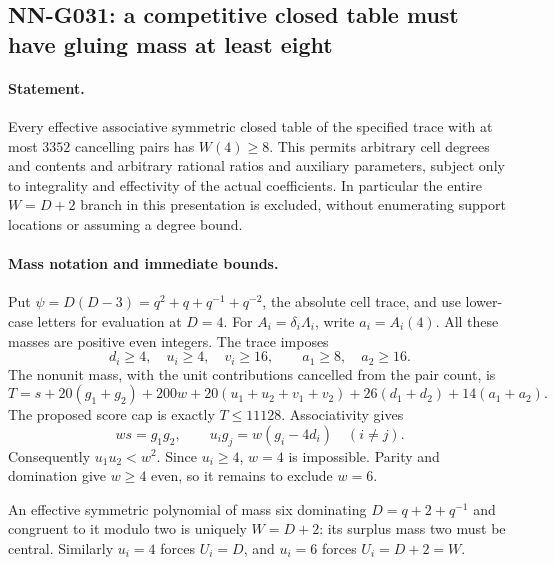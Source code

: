 \subsection{NN-G031: a competitive closed table must have gluing mass at least eight}
\paragraph{Statement.}
Every effective associative symmetric closed table of the specified trace
with at most $3352$ cancelling pairs has $W(4)\ge8$.
This permits arbitrary cell degrees and contents and arbitrary
rational ratios and auxiliary parameters, subject only to
integrality and effectivity of the actual coefficients.
In particular the entire $W=D+2$ branch in this presentation is excluded, without
enumerating support locations or assuming a degree bound.

\paragraph{Mass notation and immediate bounds.}
Put $\psi=D(D-3)=q^2+q+q^{-1}+q^{-2}$, the absolute
cell trace, and use lower-case letters for evaluation at $D=4$.
For $A_i=\delta_i\Lambda_i$, write $a_i=A_i(4)$.
All these masses are positive even integers. The trace imposes
\[
 d_i\ge4,\quad u_i\ge4,\quad v_i\ge16,\qquad
 a_1\ge8,\quad a_2\ge16.
\]
The nonunit mass, with the unit contributions cancelled from
the pair count, is
\[
 T=s+20(g_1+g_2)+200w+20(u_1+u_2+v_1+v_2)
       +26(d_1+d_2)+14(a_1+a_2).                    \tag{G031.1}
\]
The proposed score cap is exactly $T\le11128$.
Associativity gives
\[
 ws=g_1g_2,\qquad u_i g_j=w(g_i-4d_i)\quad(i\ne j).
                                                               \tag{G031.2}
\]
Consequently $u_1u_2<w^2$. Since $u_i\ge4$, $w=4$
is impossible. Parity and domination give $w\ge4$ even,
so it remains to exclude $w=6$.

An effective symmetric polynomial of mass six dominating
$D=q+2+q^{-1}$ and congruent to it modulo two is uniquely
$W=D+2$: its surplus mass two must be central.
Similarly $u_i=4$ forces $U_i=D$, and $u_i=6$ forces
$U_i=D+2=W$.

